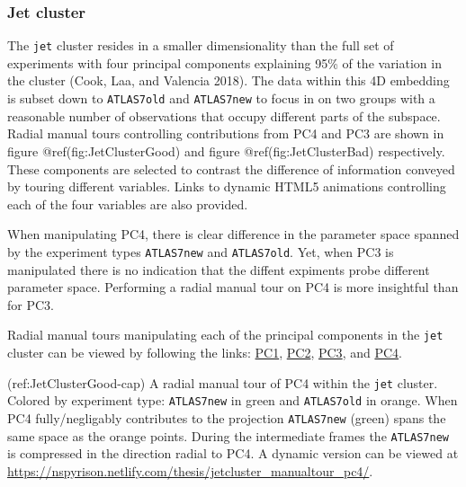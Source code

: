 \hypertarget{jet-cluster}{%
\subsubsection{Jet cluster}\label{jet-cluster}}

The \texttt{jet} cluster resides in a smaller dimensionality than the full set of experiments with four principal components explaining 95\% of the variation in the cluster (Cook, Laa, and Valencia 2018). The data within this 4D embedding is subset down to \texttt{ATLAS7old} and \texttt{ATLAS7new} to focus in on two groups with a reasonable number of observations that occupy different parts of the subspace. Radial manual tours controlling contributions from PC4 and PC3 are shown in figure @ref(fig:JetClusterGood) and figure @ref(fig:JetClusterBad) respectively. These components are selected to contrast the difference of information conveyed by touring different variables. Links to dynamic HTML5 animations controlling each of the four variables are also provided.

When manipulating PC4, there is clear difference in the parameter space spanned by the experiment types \texttt{ATLAS7new} and \texttt{ATLAS7old}. Yet, when PC3 is manipulated there is no indication that the diffent expiments probe different parameter space. Performing a radial manual tour on PC4 is more insightful than for PC3.

Radial manual tours manipulating each of the principal components in the \texttt{jet} cluster can be viewed by following the links: \href{https://nspyrison.netlify.com/thesis/jetcluster_manualtour_pc1/}{PC1}, \href{https://nspyrison.netlify.com/thesis/jetcluster_manualtour_pc2/}{PC2}, \href{https://nspyrison.netlify.com/thesis/jetcluster_manualtour_pc3/}{PC3}, and \href{https://nspyrison.netlify.com/thesis/jetcluster_manualtour_pc4/}{PC4}.

(ref:JetClusterGood-cap) A radial manual tour of PC4 within the \texttt{jet} cluster. Colored by experiment type: \texttt{ATLAS7new} in green and \texttt{ATLAS7old} in orange. When PC4 fully/negligably contributes to the projection \texttt{ATLAS7new} (green) spans the same space as the orange points. During the intermediate frames the \texttt{ATLAS7new} is compressed in the direction radial to PC4. A dynamic version can be viewed at \url{https://nspyrison.netlify.com/thesis/jetcluster_manualtour_pc4/}.

